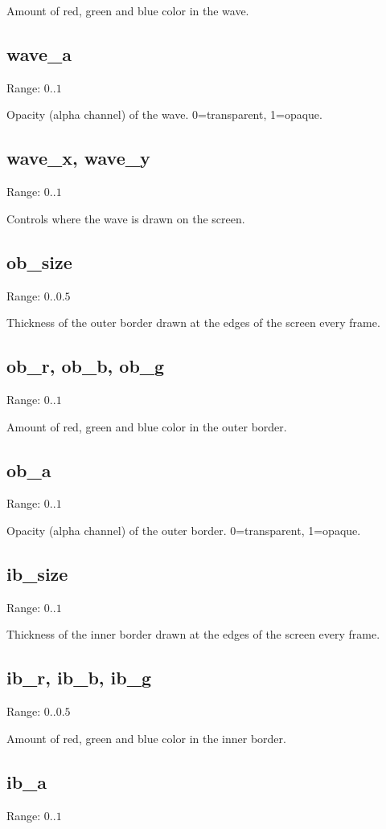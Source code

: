 \documentclass[11pt, a5paper, pagesize]{scrbook}
\begin{document}
Amount of red, green and blue color in the wave.

\subsection{wave\_a}
Range: $0..1$

Opacity (alpha channel) of the wave. 0=transparent, 1=opaque.

\subsection{wave\_x, wave\_y}
Range: $0..1$

Controls where the wave is drawn on the screen.

\subsection{ob\_size}
Range: $0..0.5$

Thickness of the outer border drawn at the edges of the screen every frame.

\subsection{ob\_r, ob\_b, ob\_g}
Range: $0..1$

Amount of red, green and blue color in the outer border.

\subsection{ob\_a}
Range: $0..1$

Opacity (alpha channel) of the outer border. 0=transparent, 1=opaque.

\subsection{ib\_size}
Range: $0..1$

Thickness of the inner border drawn at the edges of the screen every frame.

\subsection{ib\_r, ib\_b, ib\_g}
Range: $0..0.5$

Amount of red, green and blue color in the inner border.

\subsection{ib\_a}
Range: $0..1$
\end{document}
